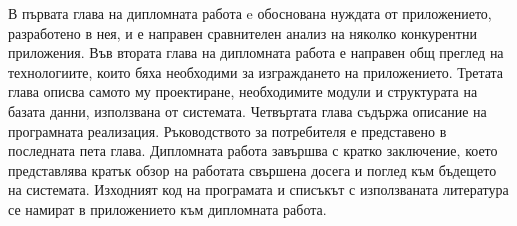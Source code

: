 В първата глава на дипломната работа e обоснована нуждата от
приложението, разработено в нея, и е направен сравнителен анализ на
няколко конкурентни приложения. Във втората глава на дипломната работа
е направен общ преглед на технологиите, които бяха необходими за
изграждането на приложението. Третата глава описва самото му
проектиране, необходимите модули и структурата на базата данни,
използвана от системата. Четвъртата глава съдържа описание на
програмната реализация.  Ръководството за потребителя е представено в
последната пета глава. Дипломната работа завършва с кратко заключение,
което представлява кратък обзор на работата свършена досега и поглед
към бъдещето на системата. Изходният код на програмата и списъкът с
използваната литература се намират в приложението към дипломната
работа.

